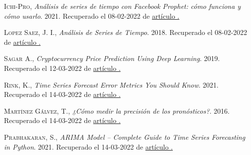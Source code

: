\documentclass[a4paper,10pt]{article}
\begin{document}
\begin{thebibliography}{X}
 \textsc{Ichi-Pro}, \textit{Análisis de series de tiempo con Facebook Prophet: cómo funciona y cómo usarlo}. 2021. Recuperado el 08-02-2022 de \href{https://ichi.pro/es/analisis-de-series-de-tiempo-con-facebook-prophet-como-funciona-y-como-usarlo-265389504990778}{artículo \faExternalLink.}

 \textsc{Lopez Saez, J. I.}, \textit{Análisis de Series de Tiempo}. 2018. Recuperado el 08-02-2022 de \href{https://ri.itba.edu.ar/bitstream/handle/123456789/1230/TFI - Jose_ Ignacio Lo_pez Sa_ez.pdf?sequence=1&isAllowed=y}{artículo \faExternalLink.}

 \textsc{Sagar A.}, \textit{Cryptocurrency Price Prediction Using Deep Learning}. 2019. Recuperado el 12-03-2022 de \href{https://towardsdatascience.com/cryptocurrency-price-prediction-using-deep-learning-70cfca50dd3a}{artículo \faExternalLink.}

 \textsc{Rink, K.}, \textit{Time Series Forecast Error Metrics You Should Know}. 2021. Recuperado el 14-03-2022 de \href{https://towardsdatascience.com/time-series-forecast-error-metrics-you-should-know-cc88b8c67f27}{artículo \faExternalLink.}

 \textsc{Martínez Gálvez, T.}, \textit{¿Cómo medir la precisión de los pronósticos?}. 2016. Recuperado el 14-03-2022 de \href{https://studylib.es/doc/4687373/¿como-medir-la-precision-de-los-pronosticos?}{artículo \faExternalLink.}

 \textsc{Prabhakaran, S.}, \textit{ARIMA Model – Complete Guide to Time Series Forecasting in Python}. 2021. Recuperado el 14-03-2022 de \href{https://www.machinelearningplus.com/time-series/arima-model-time-series-forecasting-python/}{artículo \faExternalLink.}

\end{thebibliography}
\end{document}
